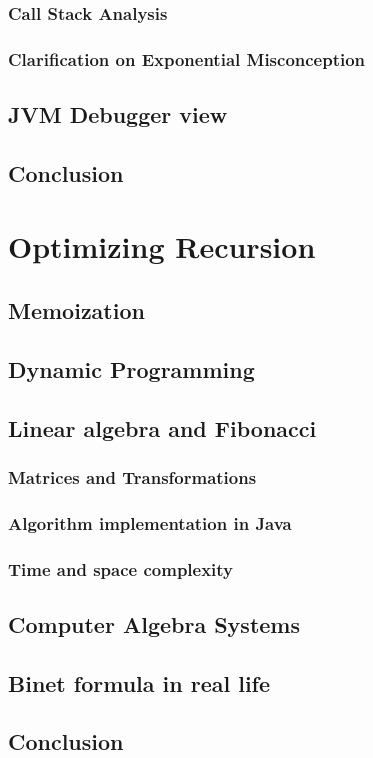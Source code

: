 \documentclass{article}
\begin{document}
\subsubsection{Call Stack Analysis}
\subsubsection{Clarification on Exponential Misconception}
\subsection{JVM Debugger view}
\subsection{Conclusion}
\section{Optimizing Recursion}
\subsection{Memoization}
\subsection{Dynamic Programming}
\subsection{Linear algebra and Fibonacci}
\subsubsection{Matrices and Transformations}
\subsubsection{Algorithm implementation in Java}
\subsubsection{Time and space complexity}
\subsection{Computer Algebra Systems}
\subsection{Binet formula in real life}
\subsection{Conclusion}
\end{document}

